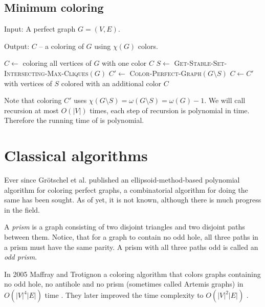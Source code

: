\subsection{Minimum coloring}

\begin{alg}
  \label{alg:minColoring}
  Input: A perfect graph $G = (V, E)$.

  \noindent Output: $C$ -- a coloring of $G$ using $\chi(G)$ colors.
\end{alg}

\begin{algorithmic}[1]
    \ls $C \gets$ coloring all vertices of $G$ with one color
    \ls \RETURN $C$
  \mElse
    \ls $S \gets$ \textsc{Get-Stable-Set-Intersecting-Max-Cliques}$(G)$
    \ls $C' \gets$ \textsc{Color-Perfect-Graph}$(G \setminus S)$
    \ls $C \gets C'$ with vertices of $S$ colored with an additional color
    \ls \RETURN $C$
  \mEndIf
  \mEndProcedure
\end{algorithmic}

Note that coloring $C'$ uses $\chi(G \setminus S) = \omega(G \setminus S) = \omega(G) -1$. We will call recursion at most $O(|V|)$ times, each step of recursion is polynomial in time. Therefore the running time of  is polynomial.

\section{Classical algorithms}
\label{sec:classicalColoring}

Ever since Grötschel et al. published an ellipsoid-method-based polynomial algorithm for coloring perfect graphs, a combinatorial algorithm for doing the same has been sought. As of yet, it is not known, although there is much progress in the field.

\begin{defn}[prism]
  A \emph{prism} is a graph consisting of two disjoint triangles and two disjoint paths between them. Notice, that for a graph to contain no odd hole, all three paths in a prism must have the same parity. A prism with all three paths odd is called an \emph{odd prism}.
  \label{def:prism}
\end{defn}

In 2005 Maffray and Trotignon a coloring algorithm that colors graphs containing no odd hole, no antihole and no prism (sometimes called Artemis graphs) in $O(|V|^4|E|)$ time \cite{Maffray2006}. They later improved the time complexity to $O(|V|^2|E|)$ \cite{Lvque2009}.

